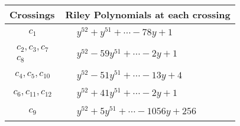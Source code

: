 \documentclass[1p]{elsarticle_modified}
\theoremstyle{definition}
\begin{document}
\begin{tabular}{m{50pt}|m{274pt}}
Crossings & \hspace{64pt}Riley Polynomials at each crossing \\
\hline $$\begin{aligned}c_{1}\end{aligned}$$&$\begin{aligned}
&y^{52}+y^{51}+\cdots-78 y+1
\end{aligned}$\\
\hline $$\begin{aligned}c_{2},c_{3},c_{7}\\c_{8}\end{aligned}$$&$\begin{aligned}
&y^{52}-59 y^{51}+\cdots-2 y+1
\end{aligned}$\\
\hline $$\begin{aligned}c_{4},c_{5},c_{10}\end{aligned}$$&$\begin{aligned}
&y^{52}-51 y^{51}+\cdots-13 y+4
\end{aligned}$\\
\hline $$\begin{aligned}c_{6},c_{11},c_{12}\end{aligned}$$&$\begin{aligned}
&y^{52}+41 y^{51}+\cdots-2 y+1
\end{aligned}$\\
\hline $$\begin{aligned}c_{9}\end{aligned}$$&$\begin{aligned}
&y^{52}+5 y^{51}+\cdots-1056 y+256
\end{aligned}$\\
\hline
\end{tabular}
\vskip 2pc
\end{document}
